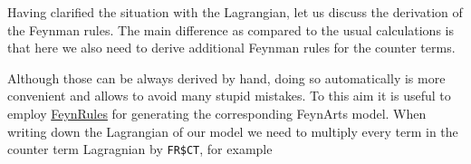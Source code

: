 \documentclass[../FeynCalcManual.tex]{subfiles}
\begin{document}
Having clarified the situation with the Lagrangian, let us discuss the
derivation of the Feynman rules. The main difference as compared to the
usual calculations is that here we also need to derive additional
Feynman rules for the counter terms.

Although those can be always derived by hand, doing so automatically is
more convenient and allows to avoid many stupid mistakes. To this aim it
is useful to employ \href{https://feynrules.irmp.ucl.ac.be/}{FeynRules}
for generating the corresponding FeynArts model. When writing down the
Lagrangian of our model we need to multiply every term in the counter
term Lagragnian by \texttt{FR\$CT}, for example

\begin{Shaded}
\begin{Highlighting}[]
\ExtensionTok{=}\SpecialCharTok{+}

\ExtensionTok{=} \SpecialCharTok{/} \OperatorTok{[}\OperatorTok{,}\OperatorTok{]} \OperatorTok{[}\OperatorTok{,}\OperatorTok{]} \SpecialCharTok{{-}} \SpecialCharTok{/}\SpecialCharTok{\^{}}\SpecialCharTok{*}\SpecialCharTok{\^{}} \SpecialCharTok{{-}} \SpecialCharTok{/}\NormalTok{(}\NormalTok{!) }\SpecialCharTok{*}\SpecialCharTok{\^{}}\NormalTok{;}
\ExtensionTok{=}  \SpecialCharTok{/}\NormalTok{) }\OperatorTok{[}\OperatorTok{,}\OperatorTok{]} \OperatorTok{[}\OperatorTok{,}\OperatorTok{]} \SpecialCharTok{{-}} \SpecialCharTok{/}\SpecialCharTok{\^{}}\NormalTok{)}\SpecialCharTok{*}\SpecialCharTok{\^{}} \SpecialCharTok{{-}} \SpecialCharTok{/}\NormalTok{(}\SpecialCharTok{\^{}}\NormalTok{)}\SpecialCharTok{*}\SpecialCharTok{*}\SpecialCharTok{\^{}}\NormalTok{;}
\end{Highlighting}
\end{Shaded}
\end{document}
